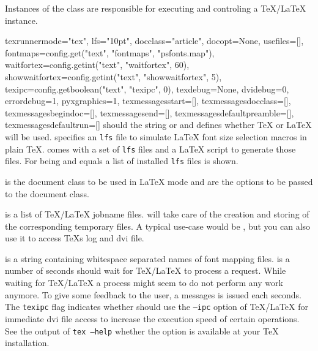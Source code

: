 Instances of the class  are responsible for executing
and controling a \TeX/\LaTeX{} instance.

\begin{classdesc}{texrunner}{mode="tex",
                             lfs="10pt",
                             docclass="article",
                             docopt=None,
                             usefiles=[],
                             fontmaps=config.get("text", "fontmaps", "psfonts.map"),
                             waitfortex=config.getint("text", "waitfortex", 60),
                             showwaitfortex=config.getint("text", "showwaitfortex", 5),
                             texipc=config.getboolean("text", "texipc", 0),
                             texdebug=None,
                             dvidebug=0,
                             errordebug=1,
                             pyxgraphics=1,
                             texmessagesstart=[],
                             texmessagesdocclass=[],
                             texmessagesbegindoc=[],
                             texmessagesend=[],
                             texmessagesdefaultpreamble=[],
                             texmessagesdefaultrun=[]}
   should the string  or  and defines
  whether \TeX{} or \LaTeX{} will be used.  specifies an
  \texttt{lfs} file to simulate \LaTeX{} font size selection macros in
  plain \TeX. \PyX{} comes with a set of \texttt{lfs} files and a
  \LaTeX{} script to generate those files. For  being
   and  equals  a list of installed
  \texttt{lfs} files is shown.
  
   is the document class to be used in \LaTeX{} mode and
   are the options to be passed to the document class.

   is a list of \TeX/\LaTeX{} jobname files. \PyX{} will
  take care of the creation and storing of the corresponding temporary
  files. A typical use-case would be , but
  you can also use it to access \TeX{}s log and dvi file.

   is a string containing whitespace separated names of
  font mapping files.  is a number of seconds \PyX{}
  should wait for \TeX/\LaTeX{} to process a request. While waiting
  for \TeX/\LaTeX{} a \PyX{} process might seem to do not perform any
  work anymore. To give some feedback to the user, a messages is
  issued each  seconds. The \texttt{texipc} flag
  indicates whether \PyX{} should use the \texttt{--ipc} option of
  \TeX/\LaTeX{} for immediate dvi file access to increase the
  execution speed of certain operations. See the output of
  \texttt{tex~--help} whether the option is available at your \TeX{}
  installation.


\end{classdesc}
